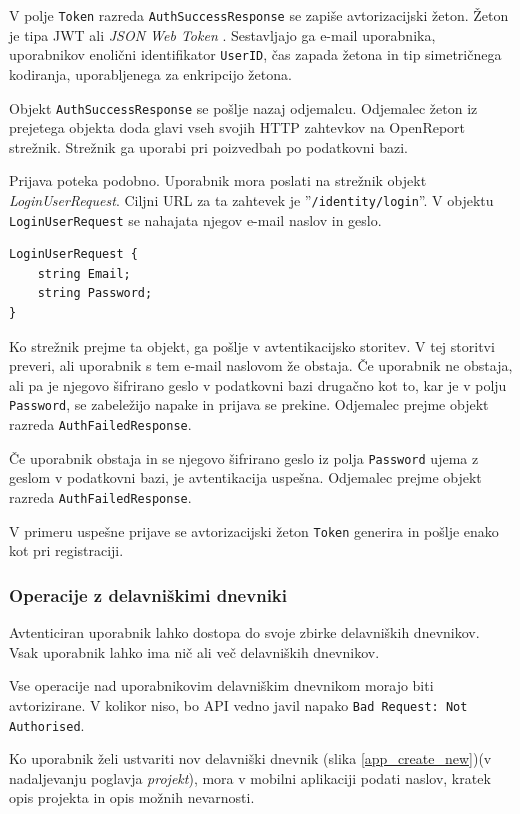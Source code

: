 \documentclass[a4paper, 12pt]{book}
\begin{document}
\noindent V polje \texttt{Token} razreda \texttt{AuthSuccessResponse} se zapiše avtorizacijski žeton.
Žeton je tipa JWT ali \textit{JSON Web Token} \cite{jwtinfo}.
Sestavljajo ga e-mail uporabnika, uporabnikov enolični identifikator \texttt{UserID}, čas zapada žetona in tip simetričnega kodiranja, uporabljenega za enkripcijo žetona.

Objekt \texttt{AuthSuccessResponse} se pošlje nazaj odjemalcu.
Odjemalec žeton iz prejetega objekta doda glavi vseh svojih HTTP zahtevkov na OpenReport strežnik.
Strežnik ga uporabi pri poizvedbah po podatkovni bazi.

Prijava poteka podobno.
Uporabnik mora poslati na strežnik objekt \textit{LoginUserRequest}.
Ciljni URL za ta zahtevek je ''\texttt{/identity/login}''.
V objektu \texttt{LoginUserRequest} se nahajata njegov e-mail naslov in geslo.

\begin{verbatim}
LoginUserRequest {
    string Email; 
    string Password; 
} 
\end{verbatim}

Ko strežnik prejme ta objekt, ga pošlje v avtentikacijsko storitev.
V tej storitvi preveri, ali uporabnik s tem e-mail naslovom že obstaja.
Če uporabnik ne obstaja, ali pa je njegovo šifrirano geslo v podatkovni bazi drugačno kot to, kar je v polju \texttt{Password}, se zabeležijo napake in prijava se prekine.
Odjemalec prejme objekt razreda \texttt{AuthFailedResponse}.

Če uporabnik obstaja in se njegovo šifrirano geslo iz polja \texttt{Password} ujema z geslom v podatkovni bazi, je avtentikacija uspešna.
Odjemalec prejme objekt razreda \texttt{AuthFailedResponse}.

V primeru uspešne prijave se avtorizacijski žeton \texttt{Token} generira in pošlje enako kot pri registraciji.

\subsubsection{Operacije z delavniškimi dnevniki}

Avtenticiran uporabnik lahko dostopa do svoje zbirke delavniških dnevnikov.
Vsak uporabnik lahko ima nič ali več delavniških dnevnikov.

Vse operacije nad uporabnikovim delavniškim dnevnikom morajo biti avtorizirane.
V kolikor niso, bo API vedno javil napako \texttt{Bad Request: Not Authorised}.

Ko uporabnik želi ustvariti nov delavniški dnevnik (slika \ref{app_create_new})(v nadaljevanju poglavja \textit{projekt}), mora v mobilni aplikaciji podati naslov, kratek opis projekta in opis možnih nevarnosti.
\end{document}
